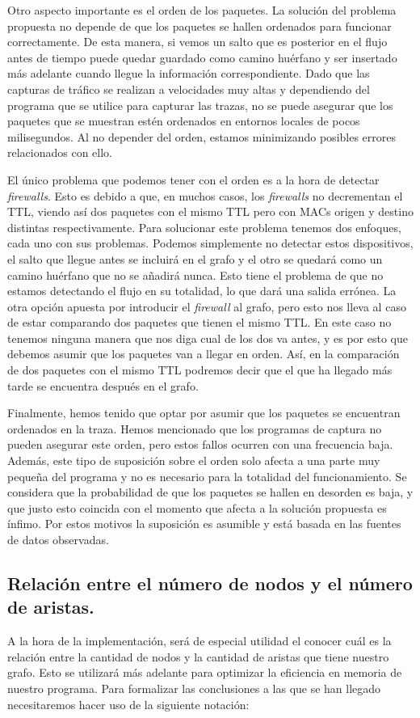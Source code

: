 \documentclass[tfg,epsbased,lof,lot,loa,final,nocopyright,overleaf]{tfgtfmthesisuam}
\begin{document}
Otro aspecto importante es el orden de los paquetes. La solución del problema propuesta no depende de que los paquetes se hallen ordenados para funcionar correctamente. De esta manera, si vemos un salto que es posterior en el flujo antes de tiempo puede quedar guardado como camino huérfano y ser insertado más adelante cuando llegue la información correspondiente. Dado que las capturas de tráfico se realizan a velocidades muy altas y dependiendo del programa que se utilice para capturar las trazas, no se puede asegurar que los paquetes que se muestran estén ordenados en entornos locales de pocos milisegundos. Al no depender del orden, estamos minimizando posibles errores relacionados con ello.

El único problema que podemos tener con el orden es a la hora de detectar \textit{firewalls}. Esto es debido a que, en muchos casos, los \textit{firewalls} no decrementan el TTL, viendo así dos paquetes con el mismo TTL pero con MACs origen y destino distintas respectivamente. Para solucionar este problema tenemos dos enfoques, cada uno con sus problemas. Podemos simplemente no detectar estos dispositivos, el salto que llegue antes se incluirá en el grafo y el otro se quedará como un camino huérfano que no se añadirá nunca. Esto tiene el problema de que no estamos detectando el flujo en su totalidad, lo que dará una salida errónea. La otra opción apuesta por introducir el \textit{firewall} al grafo, pero esto nos lleva al caso de estar comparando dos paquetes que tienen el mismo TTL. En este caso no tenemos ninguna manera que nos diga cual de los dos va antes, y es por esto que debemos asumir que los paquetes van a llegar en orden. Así, en la comparación de dos paquetes con el mismo TTL podremos decir que el que ha llegado más tarde se encuentra después en el grafo.

Finalmente, hemos tenido que optar por asumir que los paquetes se encuentran ordenados en la traza. Hemos mencionado que los programas de captura no pueden asegurar este orden, pero estos fallos ocurren con una frecuencia baja. Además, este tipo de suposición sobre el orden solo afecta a una parte muy pequeña del programa y no es necesario para la totalidad del funcionamiento. Se considera que la probabilidad de que los paquetes se hallen en desorden es baja, y que justo esto coincida con el momento que afecta a la solución propuesta es ínfimo. Por estos motivos la suposición es asumible y está basada en las fuentes de datos observadas.

\subsection{Relación entre el número de nodos y el número de aristas.}
\label{sec:Analisis:Edges per node}
A la hora de la implementación, será de especial utilidad el conocer cuál es la relación entre la cantidad de nodos y la cantidad de aristas que tiene nuestro grafo. Esto se utilizará más adelante para optimizar la eficiencia en memoria de nuestro programa. Para formalizar las conclusiones a las que se han llegado necesitaremos hacer uso de la siguiente notación:
\end{document}
